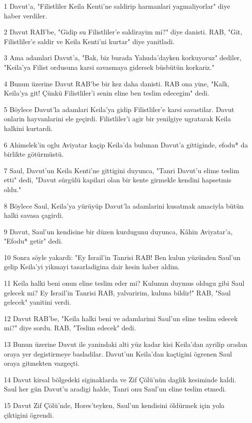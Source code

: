 \par 1 Davut'a, "Filistliler Keila Kenti'ne saldirip harmanlari yagmaliyorlar" diye haber verdiler.
\par 2 Davut RAB'be, "Gidip su Filistliler'e saldirayim mi?" diye danisti. RAB, "Git, Filistliler'e saldir ve Keila Kenti'ni kurtar" diye yanitladi.
\par 3 Ama adamlari Davut'a, "Bak, biz burada Yahuda'dayken korkuyoruz" dediler, "Keila'ya Filist ordusuna karsi savasmaya gidersek büsbütün korkariz."
\par 4 Bunun üzerine Davut RAB'be bir kez daha danisti. RAB ona yine, "Kalk, Keila'ya git! Çünkü Filistliler'i senin eline ben teslim edecegim" dedi.
\par 5 Böylece Davut'la adamlari Keila'ya gidip Filistliler'e karsi savastilar. Davut onlarin hayvanlarini ele geçirdi. Filistliler'i agir bir yenilgiye ugratarak Keila halkini kurtardi.
\par 6 Ahimelek'in oglu Aviyatar kaçip Keila'da bulunan Davut'a gittiginde, efodu* da birlikte götürmüstü.
\par 7 Saul, Davut'un Keila Kenti'ne gittigini duyunca, "Tanri Davut'u elime teslim etti" dedi, "Davut sürgülü kapilari olan bir kente girmekle kendini hapsetmis oldu."
\par 8 Böylece Saul, Keila'ya yürüyüp Davut'la adamlarini kusatmak amaciyla bütün halki savasa çagirdi.
\par 9 Davut, Saul'un kendisine bir düzen kurdugunu duyunca, Kâhin Aviyatar'a, "Efodu* getir" dedi.
\par 10 Sonra söyle yakardi: "Ey Israil'in Tanrisi RAB! Ben kulun yüzünden Saul'un gelip Keila'yi yikmayi tasarladigina dair kesin haber aldim.
\par 11 Keila halki beni onun eline teslim eder mi? Kulunun duymus oldugu gibi Saul gelecek mi? Ey Israil'in Tanrisi RAB, yalvaririm, kuluna bildir!" RAB, "Saul gelecek" yanitini verdi.
\par 12 Davut RAB'be, "Keila halki beni ve adamlarimi Saul'un eline teslim edecek mi?" diye sordu. RAB, "Teslim edecek" dedi.
\par 13 Bunun üzerine Davut ile yanindaki alti yüz kadar kisi Keila'dan ayrilip oradan oraya yer degistirmeye basladilar. Davut'un Keila'dan kaçtigini ögrenen Saul oraya gitmekten vazgeçti.
\par 14 Davut kirsal bölgedeki siginaklarda ve Zif Çölü'nün daglik kesiminde kaldi. Saul her gün Davut'u aradigi halde, Tanri onu Saul'un eline teslim etmedi.
\par 15 Davut Zif Çölü'nde, Hores'teyken, Saul'un kendisini öldürmek için yola çiktigini ögrendi.
